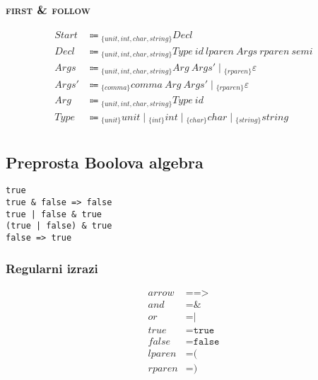 \documentclass{report}
\newcommand{\Null}{\varepsilon}
\newcommand{\Char}[1]{\texttt{#1}}
\newcommand{\Spc}{\ }
\newcommand{\Union}{\mathrel{|}}
\newcommand{\FIRST}{\textsc{first}}
\newcommand{\FOLLOW}{\textsc{follow}}
\newcommand{\Arrow}{\Coloneq}
\newlength{\arrow}
\newcommand{\NT}[1]{{#1}}
\newcommand{\T}[1]{{#1}}
\newcommand{\Lookahead}[1]{{}_{\{{#1}\}}}
\begin{document}
\subsubsection*{{\FIRST} \& {\FOLLOW}}
\begin{equation*}
  \begin{aligned}
    \NT{Start} &\Arrow \Lookahead{\T{unit}, \T{int}, \T{char}, \T{string}} \NT{Decl}\\
    \NT{Decl} &\Arrow \Lookahead{\T{unit}, \T{int}, \T{char}, \T{string}} \NT{Type} \Spc \T{id} \Spc \T{lparen} \Spc \NT{Args} \Spc \T{rparen} \Spc \T{semi}\\
    \NT{Args} &\Arrow \Lookahead{\T{unit}, \T{int}, \T{char}, \T{string}} \NT{Arg} \Spc \NT{Args'} \Union \Lookahead{\T{rparen}} \Null\\
    \NT{Args'} &\Arrow \Lookahead{\T{comma}} \T{comma} \Spc \NT{Arg} \Spc \NT{Args'} \Union \Lookahead{\T{rparen}} \Null \\
    \NT{Arg} &\Arrow \Lookahead{\T{unit}, \T{int}, \T{char}, \T{string}} \NT{Type} \Spc \T{id}\\
    \NT{Type} &\Arrow \Lookahead{\T{unit}} \T{unit} \Union \Lookahead{\T{int}} \T{int} \Union \Lookahead{\T{char}} \T{char} \Union \Lookahead{\T{string}} \T{string}\\
  \end{aligned}
\end{equation*}

\subsection{Preprosta Boolova algebra}
\begin{verbatim}
true
true & false => false
true | false & true
(true | false) & true
false => true
\end{verbatim}

\subsubsection*{Regularni izrazi}
\begin{equation*}
  \begin{aligned}
    \T{arrow} &= \Char{=>}\\
    \T{and} &= \Char{\&}\\
    \T{or} &= \Char{|}\\
    \T{true} &= \Char{true}\\
    \T{false} &= \Char{false}\\
    \T{lparen} &= \Char{(}\\
    \T{rparen} &= \Char{)}\\
  \end{aligned}
\end{equation*}
\end{document}
